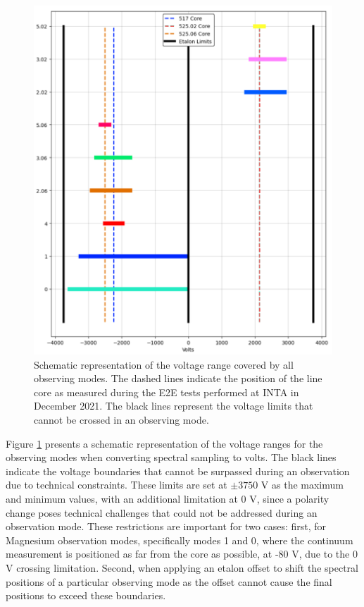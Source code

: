 \begin{figure}[t]
    \begin{minipage}[c]{0.67\textwidth}
      \includegraphics[width=\textwidth]{figures/Pipeline/obs_modes.pdf}
    \end{minipage}\hfill
    \begin{minipage}[c]{0.29\textwidth}
      \caption[Voltage ranges of TuMag's observation modes.]{
       Schematic representation of the voltage range covered by all observing modes. The dashed lines indicate the position of the line core as measured during the E2E tests performed at INTA in December 2021. The black lines represent the voltage limits that cannot be crossed in an observing mode.
       \label{fig_pipeline: Observing modes ranges}} 
    \end{minipage}
\end{figure}

Figure \ref{fig_pipeline: Observing modes ranges} presents a schematic representation of the voltage ranges for the observing modes when converting spectral sampling to volts. The black lines indicate the voltage boundaries that cannot be surpassed during an observation due to technical constraints. These limits are set at $\pm 3750$ V as the maximum and minimum values, with an additional limitation at 0 V, since a polarity change poses technical challenges that could not be addressed during an observation mode. These restrictions are important for two cases: first, for Magnesium observation modes, specifically modes 1 and 0, where the continuum measurement is positioned as far from the core as possible, at -80 V, due to the 0 V crossing limitation. Second, when applying an etalon offset to shift the spectral positions of a particular observing mode as the offset cannot cause the final positions to exceed these boundaries.

